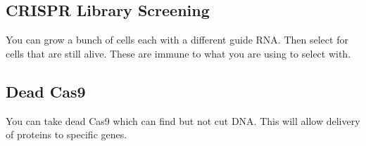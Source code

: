 \documentclass{article}
\begin{document}
\subsection{CRISPR Library Screening}

You can grow a bunch of cells each with a different guide RNA. Then select for cells that are still alive. These are immune to what you are using to select with.

\subsection{Dead Cas9}

You can take dead Cas9 which can find but not cut DNA. This will allow delivery of proteins to specific genes.
\end{document}
